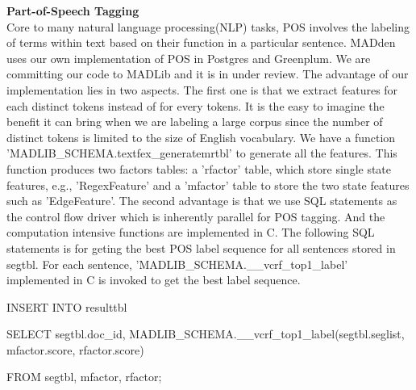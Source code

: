 \noindent
\textbf{Part-of-Speech Tagging}\\

Core to many natural language processing(NLP) tasks, POS involves the
labeling of
terms within text based on their function in a particular sentence. MADden
uses our
own implementation of POS in Postgres and Greenplum. We are committing our
code to
MADLib and it is in under review. The advantage of our implementation lies
in two
aspects. The first one is that we extract features for each distinct
tokens instead of
for every tokens.  It is the easy to imagine the benefit it can bring when
we are
labeling a large corpus since the number of distinct tokens is limited to
the size
of English vocabulary. We have a function
'MADLIB\_SCHEMA.textfex\_generatemrtbl' to
generate all the features. This function produces two factors tables: a
'rfactor'
table, which store single state features, e.g., 'RegexFeature' and a
'mfactor'
table to store the two state features such as 'EdgeFeature'.  The second
advantage is
that we use SQL statements as the control flow driver which is inherently
parallel for POS tagging. And the computation intensive functions are
implemented in C. The
following SQL statements is for geting the best POS label sequence for all
sentences
stored in segtbl.  For each sentence,
'MADLIB\_SCHEMA.\_\_vcrf\_top1\_label' implemented in
C is invoked to get the best label sequence.

INSERT INTO resulttbl

SELECT   segtbl.doc\_id, MADLIB\_SCHEMA.\_\_vcrf\_top1\_label(segtbl.seglist,
        mfactor.score, rfactor.score)

FROM   segtbl, mfactor, rfactor;
